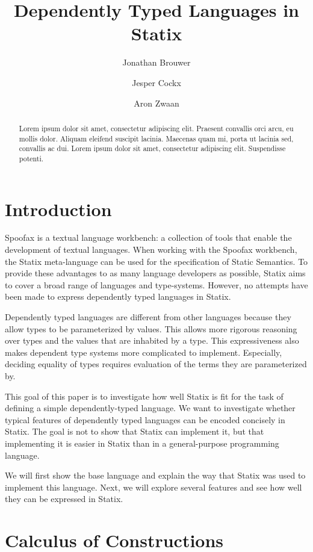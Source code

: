 \documentclass[a4paper,UKenglish,cleveref, autoref, thm-restate]{oasics-v2021}
\title{Dependently Typed Languages in Statix} %
\author{Jonathan Brouwer}{Delft University of Technology, The Netherlands \and \url{http://jonathanb.nl}}{j.t.brouwer@student.tudelft.nl}{}{}
\author{Jesper Cockx}{Delft University of Technology, The Netherlands \and \url{http://jesper.sikanda.be}}{j.g.h.cockx@tudelft.nl}{}{}
\author{Aron Zwaan}{Delft University of Technology, The Netherlands \and \url{http://aronzwaan.github.io}}{a.s.zwaan@tudelft.nl}{}{}
\begin{document}
\maketitle

\begin{abstract}
Lorem ipsum dolor sit amet, consectetur adipiscing elit. Praesent convallis orci arcu, eu mollis dolor. Aliquam eleifend suscipit lacinia. Maecenas quam mi, porta ut lacinia sed, convallis ac dui. Lorem ipsum dolor sit amet, consectetur adipiscing elit. Suspendisse potenti. 
\end{abstract}

\section{Introduction}

Spoofax is a textual language workbench: \label{key}a collection of tools that enable the development of textual languages. When working with the Spoofax workbench, the Statix meta-language can be used for the specification of Static Semantics. To provide these advantages to as many language developers as possible, Statix aims to cover a broad range of languages and type-systems. However, no attempts have been made to express dependently typed languages in Statix. 

Dependently typed languages are different from other languages because they allow types to be parameterized by values. This allows more rigorous reasoning over types and the values that are inhabited by a type. This expressiveness also makes dependent type systems more complicated to implement. Especially, deciding equality of types requires evaluation of the terms they are parameterized by. 

This goal of this paper is to investigate how well Statix is fit for the task of defining a simple dependently-typed language. We want to investigate whether typical features of dependently typed languages can be encoded concisely in Statix. The goal is not to show that Statix can implement it, but that implementing it is easier in Statix than in a general-purpose programming language. 

We will first show the base language and explain the way that Statix was used to implement this language. Next, we will explore several features and see how well they can be expressed in Statix.

\section{Calculus of Constructions}
\end{document}
